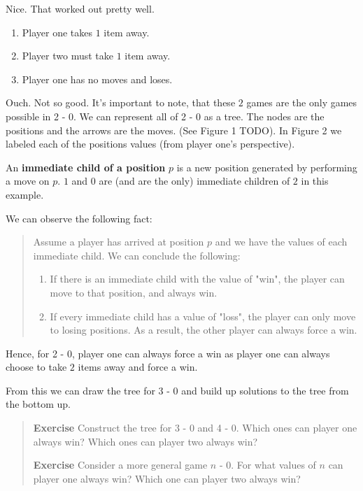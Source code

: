 \documentclass[a4paper]{article}
\begin{document}
Nice. That worked out pretty well.

\begin{enumerate}
    \item{Player one takes $1$ item away.}
    \item{Player two must take $1$ item away.}
    \item{Player one has no moves and loses.}
\end{enumerate}

Ouch. Not so good. It's important to note, that these $2$ games are the only games possible in 2 - 0. We can represent all of 2 - 0 as a tree. The nodes are the positions and the arrows are the moves. (See Figure 1 TODO). In Figure 2 we labeled each of the positions values (from player one's perspective).

An \textbf{immediate child of a position} $p$ is a new position generated by performing a move on $p$. $1$ and $0$ are (and are the only) immediate children of $2$ in this example.

We can observe the following fact:

\begin{quote}
    Assume a player has arrived at position $p$ and we have the values of each immediate child. We can conclude the following:
    \begin{enumerate}
        \item{ If there is an immediate child with the value of "win", the player can move to that position, and always win.}
        \item{ If every immediate child has a value of "loss", the player can only move to losing positions. As a result, the other player can always force a win.}
    \end{enumerate}
\end{quote}

Hence, for 2 - 0, player one can always force a win as player one can always choose to take $2$ items away and force a win.

From this we can draw the tree for 3 - 0 and build up solutions to the tree from the bottom up.

\begin{quote}
    \textbf{Exercise} Construct the tree for 3 - 0 and 4 - 0. Which ones can player one always win? Which ones can player two always win?

    \textbf{Exercise} Consider a more general game $n$ - 0. For what values of $n$ can player one always win? Which one can player two always win?
\end{quote}
\end{document}

